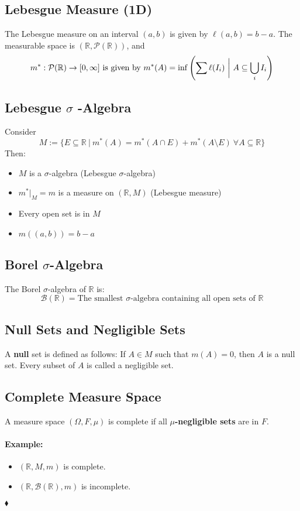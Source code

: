 \documentclass{article}
\newenvironment{example}{\paragraph{Example:}}{\hfill $\blacklozenge $}
\begin{document}
\subsection{Lebesgue Measure (1D)}
The Lebesgue measure on an interval $(a, b)$ is given by $\ell(a, b) = b - a$. The measurable space is $( \mathbb{R}, \mathcal{P}(\mathbb{R}))$, and
\[m^* : \mathcal{P}(\mathbb{R}) \to [0, \infty] \text{ is given by    } \\
m^*(A) = \inf \left( \sum \ell(I_i) \ \bigg|\ A \subseteq \bigcup_i I_i \right)\]

\subsection{Lebesgue $\sigma$ -Algebra}
Consider
\[M := \{ E \subseteq \mathbb{R} \ | \ m^*(A) = m^*(A \cap E) + m^*(A \setminus E) \ \forall A \subseteq \mathbb{R} \}\]
Then:
\begin{itemize}
    \item $M$ is a $\sigma$-algebra (Lebesgue $\sigma$-algebra)
    \item $m^*|_M = m$ is a measure on $(\mathbb{R}, M)$ (Lebesgue measure)
    \item Every open set is in $M$
    \item $m((a, b)) = b - a$
\end{itemize}

\subsection{Borel $\sigma$-Algebra}
The Borel $\sigma$-algebra of $\mathbb{R}$ is:
\[
\mathcal{B}(\mathbb{R}) = \text{The smallest } \sigma\text{-algebra containing all open sets of } \mathbb{R}
\]

\subsection{Null Sets and Negligible Sets}
A \textbf{null} set is defined as follows: If $A \in M$ such that $m(A) = 0$, then $A$ is a null set. Every subset of $A$ is called a negligible set.

\subsection{Complete Measure Space}
A measure space $(\Omega, F, \mu)$ is complete if all \textbf{$\mu$-negligible sets} are in $F$.

\begin{example}
    \begin{itemize}
        \item $(\mathbb{R}, M, m)$ is complete.
        \item $(\mathbb{R}, \mathcal{B}(\mathbb{R}), m)$ is incomplete.
    \end{itemize}
        
\end{example}
\end{document}
